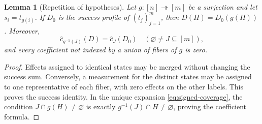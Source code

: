 \documentclass[a4paper,11pt,onecolumn,unpublished]{quantumarticle}
\newtheorem{lemma}[theorem]{Lemma}
\theoremstyle{definition}
\newcommand{\1}{\mathbf 1}
\begin{document}
\begin{lemma}[Repetition of hypotheses]\label{lem:cloning}
Let $g:[n]\twoheadrightarrow[m]$ be a surjection and let $s_i=t_{g(i)}$.
If $D_0$ is the success profile of $(t_j)_{j=1}^m$, then
$D(H)=D_0(g(H))$. Moreover,
\begin{equation}\label{eq:cloning-coefficients}
 \widehat c_{g^{-1}(J)}(D)=\widehat c_J(D_0)
 \quad(\varnothing\ne J\subseteq[m]),
\end{equation}
and every coefficient not indexed by a union of fibers of $g$ is zero.
\end{lemma}
\begin{proof}
Effects assigned to identical states may be merged without changing the
success sum. Conversely, a measurement for the distinct states may be
assigned to one representative of each fiber, with zero effects on the other
labels. This proves the success identity. In the unique expansion
\eqref{eq:signed-coverage}, the condition $J\cap g(H)\ne\varnothing$ is exactly
$g^{-1}(J)\cap H\ne\varnothing$, proving the coefficient formula.
\end{proof}
\end{document}
